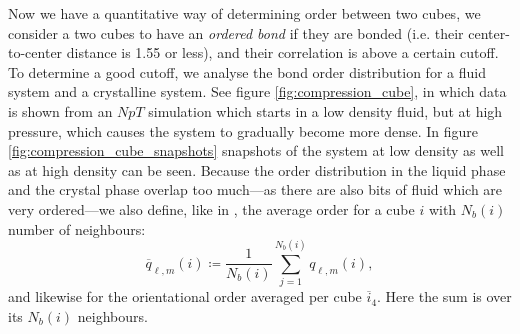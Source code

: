 \documentclass[thesis]{subfiles}
\begin{document}
Now we have a quantitative way of determining order between two cubes, we consider a two cubes to have an \emph{ordered bond} if they are bonded (i.e. their center-to-center distance is 1.55 or less), and their correlation is above a certain cutoff. To determine a good cutoff, we analyse the bond order distribution for a fluid system and a crystalline system. See figure \ref{fig:compression_cube}, in which data is shown from an $NpT$ simulation which starts in a low density fluid, but at high pressure, which causes the system to gradually become more dense. In figure \ref{fig:compression_cube_snapshots} snapshots of the system at low density as well as at high density can be seen. Because the order distribution in the liquid phase and the crystal phase overlap too much---as there are also bits of fluid which are very ordered---we also define, like in \cite{lechner2008accurate}, the average order for a cube $i$ with $N_b(i)$ number of neighbours:
\begin{equation}
	\overline q_{\ell, m}(i) \coloneqq \frac{1}{N_b(i)} \sum_{j = 1}^{N_b(i)}q_{\ell, m}(i),
\end{equation}
and likewise for the orientational order averaged per cube $\overline i_4$. Here the sum is over its $N_b(i)$ neighbours.
\end{document}
